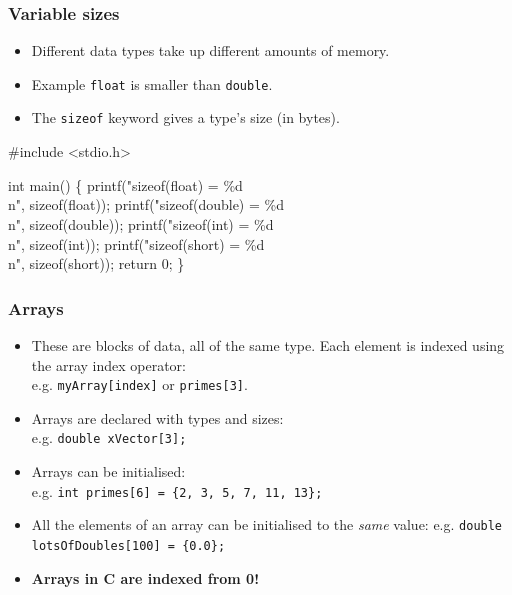 \documentclass[table]{beamer}
\newif\ifschigh\schighfalse
\newcommand{\kw}[1]{\ifschigh\textcolor{red}{#1}\else\textcolor{keyword}{#1}\fi}
\newcommand{\kt}[1]{\ifschigh\textcolor{red}{#1}\else\textcolor{ctext}{#1}\fi}
\begin{document}
\begin{frame}[fragile]
\frametitle{Variable sizes}
\begin{itemize}
\item Different data types take up different amounts of memory.
\item Example \kw{\tt float} is smaller than \kw{\tt double}.
\item The \kw{\tt sizeof} keyword gives a type's size (in bytes).
\end{itemize}

{
\small
\begin{semiverbatim}
\kw{\#include} \kt{<stdio.h>}

\kw{int} main()
\{
   printf(\kt{"sizeof(float) = \%d\\n"}, \kw{sizeof}(\kw{float}));
   printf(\kt{"sizeof(double) = \%d\\n"}, \kw{sizeof}(\kw{double}));
   printf(\kt{"sizeof(int) = \%d\\n"}, \kw{sizeof}(\kw{int}));
   printf(\kt{"sizeof(short) = \%d\\n"}, \kw{sizeof}(\kw{short}));
   \kw{return} 0;
\}
\end{semiverbatim}
}
\end{frame}

\begin{frame}
\frametitle{Arrays}
\begin{itemize}
\item These are blocks of data, all of the same type. Each element is indexed
using the array index operator:\\
e.g. {\tt myArray[index]} or {\tt primes[3]}.
\item Arrays are declared with types and sizes:\\
e.g. {\tt \kw{double} xVector[3];}
\item Arrays can be initialised:\\
e.g. {\tt \kw{int} primes[6] = \{2, 3, 5, 7, 11, 13\};}
\item All the elements of an array can be initialised to the \emph{same} value:
e.g. {\tt \kw{double} lotsOfDoubles[100] = \{0.0\};}
\item \bf Arrays in C are indexed from 0!
\end{itemize}
\end{frame}
\end{document}
